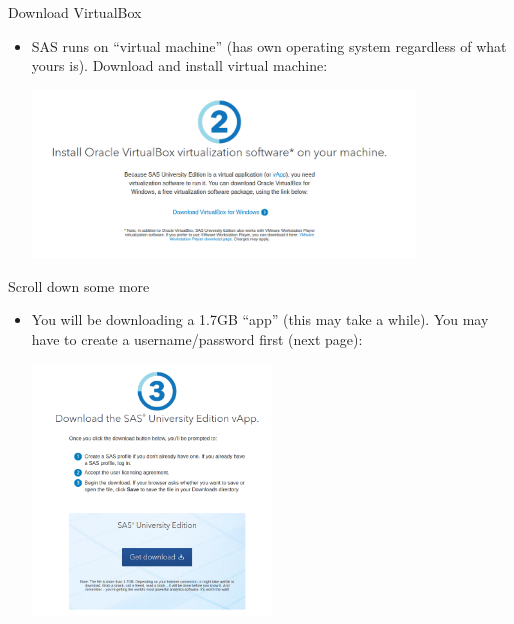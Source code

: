 \documentclass[unknownkeysallowed]{beamer}\usepackage[]{graphicx}\usepackage[]{color}
\begin{document}
\begin{frame}[fragile]{Download VirtualBox}
  
  \begin{itemize}
  \item SAS runs on ``virtual machine'' (has own operating system
    regardless of what yours is). Download and install virtual machine:
    
    \includegraphics[width=4in]{sas19}
  \end{itemize}
  
\end{frame}


\begin{frame}[fragile]{Scroll down some more}
  
  \begin{itemize}
  \item You will be downloading a 1.7GB ``app'' (this may take a while). You may
    have to create a username/password first (next page):
    
    \includegraphics[width=2.5in]{sas20}
  \end{itemize}
  
  
\end{frame}
\end{document}
